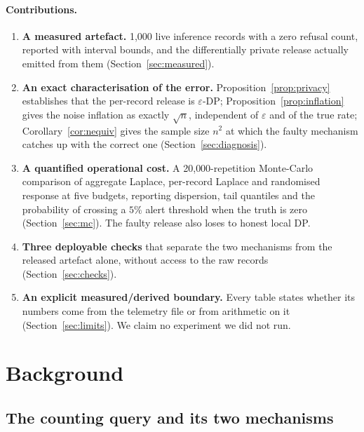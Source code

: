 \documentclass[journal]{IEEEtran}
\theoremstyle{definition}
\newcommand{\Nrec}{1{,}000}
\newcommand{\Trials}{20{,}000}
\newcommand{\AlarmTau}{5}
\begin{document}
\paragraph{Contributions.}
\begin{enumerate}
\item \textbf{A measured artefact.} \Nrec{} live inference records with a zero
refusal count, reported with interval bounds, and the differentially private
release actually emitted from them (Section~\ref{sec:measured}).

\item \textbf{An exact characterisation of the error.}
Proposition~\ref{prop:privacy} establishes that the per-record release is
$\varepsilon$-DP; Proposition~\ref{prop:inflation} gives the noise inflation as
exactly $\sqrt{n}$, independent of $\varepsilon$ and of the true rate;
Corollary~\ref{cor:nequiv} gives the sample size $n^2$ at which the faulty
mechanism catches up with the correct one (Section~\ref{sec:diagnosis}).

\item \textbf{A quantified operational cost.} A \Trials-repetition Monte-Carlo
comparison of aggregate Laplace, per-record Laplace and randomised response at
five budgets, reporting dispersion, tail quantiles and the probability of
crossing a $\AlarmTau\%$ alert threshold when the truth is zero
(Section~\ref{sec:mc}). The faulty release also loses to honest local DP.

\item \textbf{Three deployable checks} that separate the two mechanisms from the
released artefact alone, without access to the raw records
(Section~\ref{sec:checks}).

\item \textbf{An explicit measured/derived boundary.} Every table states
whether its numbers come from the telemetry file or from arithmetic on it
(Section~\ref{sec:limits}). We claim no experiment we did not run.
\end{enumerate}

\section{Background}
\label{sec:background}

\subsection{The counting query and its two mechanisms}
\end{document}
